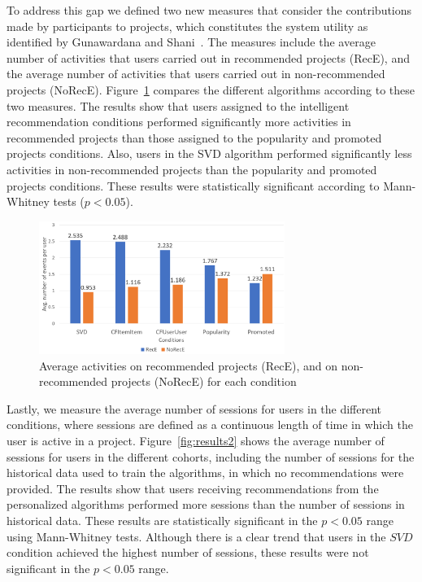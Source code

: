 \documentclass[letterpaper]{article} %
\newcommand{\kibitz}[2]{\ifnum\Comments=1{\textcolor{#1}{#2}}\fi}
\newcommand{\kg}[1]{\kibitz{red}{[KG:#1]}}
\begin{document}
To address this gap we defined two new measures that consider the contributions made by participants 
to projects, which constitutes the system utility as identified by Gunawardana and Shani~\cite{gunawardana2009survey}. 
 The measures include the  average number of activities that users 
carried out in recommended projects (RecE), and the average number of activities that users carried out in 
non-recommended projects (NoRecE). Figure~\ref{fig:results} compares the different  algorithms according to these two measures. The results show that users assigned to the intelligent recommendation conditions  performed  significantly more activities in recommended projects than those assigned to the   popularity and promoted projects conditions. 
Also, users in  the SVD algorithm performed  significantly less activities  in non-recommended projects than the popularity and promoted projects conditions. 
These results 
were statistically significant according to Mann-Whitney tests ($p<0.05$).
\begin{figure}[t]%
     \centering
    \includegraphics[width=8cm]{Figs/results1.png} 
    \caption{Average activities on recommended projects (RecE), and on non-recommended 
    projects (NoRecE) for each condition}
     \label{fig:results}%
 \end{figure}
 
 Lastly, we measure the average number of sessions  for users in the different conditions, where sessions are defined as a  continuous length of time in which the user is active in a project. 
Figure~\ref{fig:results2} shows the average number of sessions for users in the different cohorts, including the number of sessions for the historical data used to train the algorithms, in which no recommendations 
were provided. 
The results show that users  receiving recommendations from the personalized algorithms 
performed more sessions than the number of sessions in historical data. These results are statistically significant in the $p<0.05$ range using Mann-Whitney tests.
Although there is a clear trend that users in the $SVD$ condition achieved the highest number of sessions, these results were not significant in the $p<0.05$ range.
\end{document}
